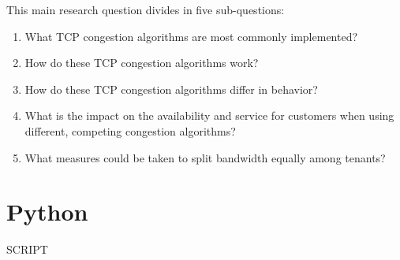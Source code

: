 \documentclass{article}
\begin{document}
\vspace{0.5cm}

This main research question divides in five sub-questions:

\begin{enumerate}
	\item What TCP congestion algorithms are most commonly implemented?
	\item How do these TCP congestion algorithms work?
	\item How do these TCP congestion algorithms differ in behavior?
	\item What is the impact on the availability and service for customers when using different, competing congestion algorithms?
	\item What measures could be taken to split bandwidth equally among tenants?
\end{enumerate}


\printbibliography

\appendix
\section{Python}
\label{appendix:python}
SCRIPT
\end{document}
